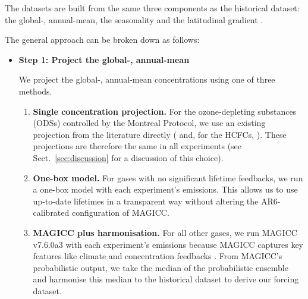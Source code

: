 The datasets are built from the same three components as the historical dataset:
the global-, annual-mean, the seasonality and the latitudinal gradient \citep{nicholls_historical-ghgs_2026}.

The general approach can be broken down as follows:

\begin{itemize}
    \item {
        \textbf{Step 1: Project the global-, annual-mean}

        We project the global-, annual-mean concentrations using one of three methods.

        \begin{enumerate}
            \item {
                \textbf{Single concentration projection.}
                For the ozone-depleting substances (ODSs) controlled by the Montreal Protocol,
                we use an existing projection from the literature directly
                (\citealp{wmo_ozone-ch7_2022} and, for the HCFCs, \citealp{western_hcfcs_2024}).
                These projections are therefore the same in all experiments
                (see Sect.~\ref{sec:discussion} for a discussion of this choice).
            }
            \item {
                \textbf{One-box model.}
                For gases with no significant lifetime feedbacks,
                we run a one-box model with each experiment's emissions.
                This allows us to use up-to-date lifetimes \citep[Table A-5,][]{wmo_ozone-ch7_2022}
                in a transparent way
                without altering the AR6-calibrated configuration of MAGICC.
            }
            \item {
                \textbf{MAGICC plus harmonisation.}
                For all other gases, we run MAGICC v7.6.0a3 with each experiment's emissions
                because MAGICC captures key features like climate and concentration feedbacks \citep{meinshausen_magicc6-part-1_2011,meinshausen_ssp-ghgs_2020}.
                From MAGICC's probabilistic output,
                we take the median of the probabilistic ensemble
                and harmonise this median to the historical dataset
                to derive our forcing dataset.
            }
        \end{enumerate}

}
\end{itemize}
